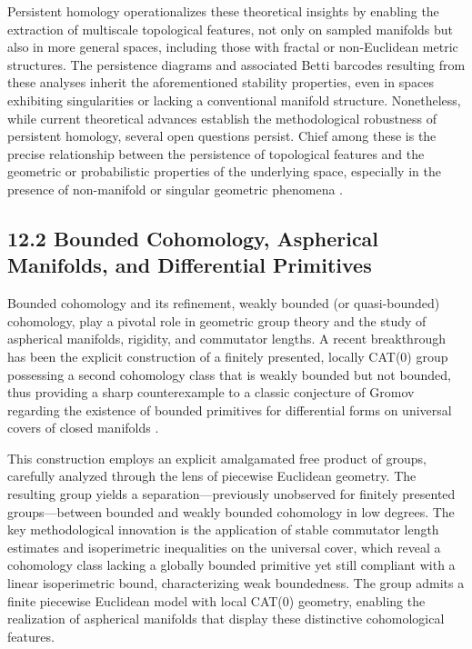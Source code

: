 \documentclass[11pt]{article}
\begin{document}
Persistent homology operationalizes these theoretical insights by enabling the extraction of multiscale topological features, not only on sampled manifolds but also in more general spaces, including those with fractal or non-Euclidean metric structures. The persistence diagrams and associated Betti barcodes resulting from these analyses inherit the aforementioned stability properties, even in spaces exhibiting singularities or lacking a conventional manifold structure. Nonetheless, while current theoretical advances establish the methodological robustness of persistent homology, several open questions persist. Chief among these is the precise relationship between the persistence of topological features and the geometric or probabilistic properties of the underlying space, especially in the presence of non-manifold or singular geometric phenomena \cite{ref88}.

\subsection{12.2 Bounded Cohomology, Aspherical Manifolds, and Differential Primitives}

Bounded cohomology and its refinement, weakly bounded (or quasi-bounded) cohomology, play a pivotal role in geometric group theory and the study of aspherical manifolds, rigidity, and commutator lengths. A recent breakthrough has been the explicit construction of a finitely presented, locally CAT(0) group possessing a second cohomology class that is weakly bounded but not bounded, thus providing a sharp counterexample to a classic conjecture of Gromov regarding the existence of bounded primitives for differential forms on universal covers of closed manifolds \cite{ref84}.

This construction employs an explicit amalgamated free product of groups, carefully analyzed through the lens of piecewise Euclidean geometry. The resulting group yields a separation—previously unobserved for finitely presented groups—between bounded and weakly bounded cohomology in low degrees. The key methodological innovation is the application of stable commutator length estimates and isoperimetric inequalities on the universal cover, which reveal a cohomology class lacking a globally bounded primitive yet still compliant with a linear isoperimetric bound, characterizing weak boundedness. The group admits a finite piecewise Euclidean model with local CAT(0) geometry, enabling the realization of aspherical manifolds that display these distinctive cohomological features.
\end{document}
